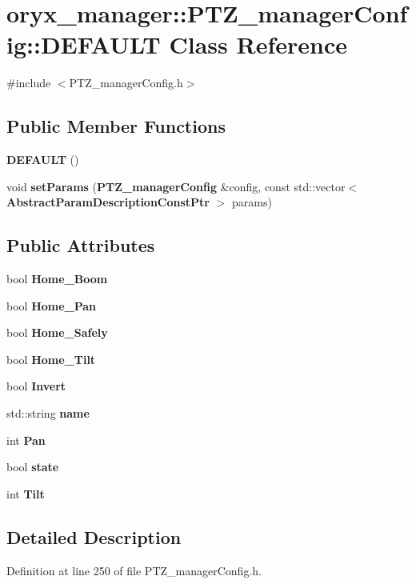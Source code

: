 \section{oryx\-\_\-manager\-:\-:\-P\-T\-Z\-\_\-manager\-Config\-:\-:\-D\-E\-F\-A\-U\-L\-T \-Class \-Reference}
\label{classoryx__manager_1_1PTZ__managerConfig_1_1DEFAULT}


{\ttfamily \#include $<$\-P\-T\-Z\-\_\-manager\-Config.\-h$>$}

\subsection*{\-Public \-Member \-Functions}
\begin{DoxyCompactItemize}
\item 
{\bf \-D\-E\-F\-A\-U\-L\-T} ()
\item 
void {\bf set\-Params} ({\bf \-P\-T\-Z\-\_\-manager\-Config} \&config, const std\-::vector$<$ {\bf \-Abstract\-Param\-Description\-Const\-Ptr} $>$ params)
\end{DoxyCompactItemize}
\subsection*{\-Public \-Attributes}
\begin{DoxyCompactItemize}
\item 
bool {\bf \-Home\-\_\-\-Boom}
\item 
bool {\bf \-Home\-\_\-\-Pan}
\item 
bool {\bf \-Home\-\_\-\-Safely}
\item 
bool {\bf \-Home\-\_\-\-Tilt}
\item 
bool {\bf \-Invert}
\item 
std\-::string {\bf name}
\item 
int {\bf \-Pan}
\item 
bool {\bf state}
\item 
int {\bf \-Tilt}
\end{DoxyCompactItemize}


\subsection{\-Detailed \-Description}


\-Definition at line 250 of file \-P\-T\-Z\-\_\-manager\-Config.\-h.




